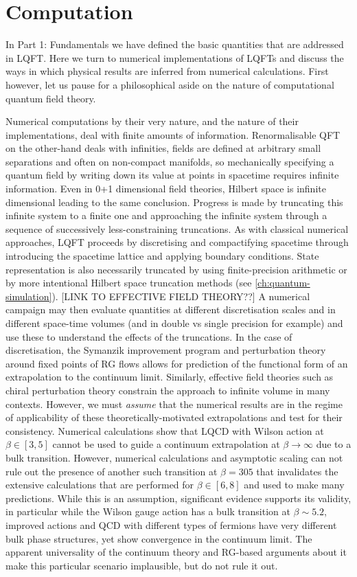 \part{Computation}
\label{part:computation}

In Part 1: Fundamentals we have defined the basic quantities that are addressed in LQFT. Here we turn to numerical implementations of LQFTs and discuss the ways in which physical results are inferred from numerical calculations.
 First however, let us pause for a philosophical aside on the nature of computational quantum field theory. 
 
 Numerical computations by their very nature, and the nature of their implementations, deal with finite amounts of information. Renormalisable QFT on the other-hand deals with infinities, fields are defined at arbitrary small separations and often on non-compact manifolds, so mechanically specifying a quantum field by writing down its value at points in spacetime requires infinite information. Even in 0+1 dimensional field theories, Hilbert space is  infinite dimensional leading to the same conclusion. Progress is made by truncating this infinite system to a finite one and approaching the infinite system through a sequence of successively less-constraining truncations. As with classical numerical approaches, LQFT proceeds by discretising and compactifying spacetime through introducing the spacetime lattice and applying boundary conditions. State representation is also necessarily truncated by using finite-precision arithmetic or by more intentional Hilbert space truncation methods (see \ref{ch:quantum-simulation}). [LINK TO EFFECTIVE FIELD THEORY??] A numerical campaign may then evaluate quantities at different discretisation scales and in different space-time volumes (and in double vs single precision for example) and use these to understand the effects of the truncations. In the case of discretisation, the Symanzik improvement program and perturbation theory around fixed points of RG flows allows for prediction of the functional form of an extrapolation to the continuum limit. Similarly, effective field theories such as chiral perturbation theory constrain the approach to infinite volume in many contexts. However, we must \textit{assume} that the numerical results are in the regime of applicability of these theoretically-motivated extrapolations and test for their consistency. Numerical calculations show that LQCD with  Wilson action at $\beta\in[3,5]$ cannot be used to guide a continuum extrapolation at $\beta\to\infty$ due to a bulk transition. However, numerical calculations  and asymptotic scaling can not rule out the presence of another such transition at $\beta=305$ that invalidates the extensive calculations that are performed for $\beta\in[6,8]$ and used to make many predictions. While this is an assumption, significant evidence supports its validity, in particular while the Wilson gauge action has a bulk transition at $\beta\sim5.2$, improved actions and QCD with different types of fermions have very different bulk phase structures, yet show convergence in the continuum limit. The apparent universality of the continuum theory and  RG-based  arguments  about it make this particular scenario implausible, but do not rule it out.

